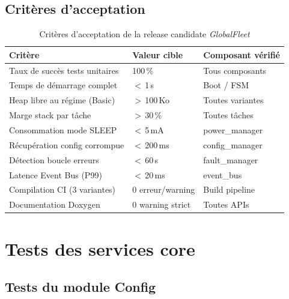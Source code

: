 \subsection{Critères d'acceptation}
\label{subsec:accept}

\begin{table}[H]
\centering
\renewcommand{\arraystretch}{1.6}
\caption{Critères d'acceptation de la release candidate \textit{GlobalFleet}}
\label{tab:acceptance}
\small
\begin{tabular}{|p{4.8cm}|p{3.0cm}|p{3.5cm}|}
\hline
\rowcolor{gray!20}
\textbf{Critère} & \textbf{Valeur cible} & \textbf{Composant vérifié} \\
\hline
Taux de succès tests unitaires   & 100\,\%         & Tous composants \\
\hline
Temps de démarrage complet       & $<$\,1\,s        & Boot / FSM \\
\hline
Heap libre au régime (Basic)     & $>$\,100\,Ko     & Toutes variantes \\
\hline
Marge stack par tâche            & $>$\,30\,\%      & Toutes tâches \\
\hline
Consommation mode SLEEP          & $<$\,5\,mA       & power\_manager \\
\hline
Récupération config corrompue    & $<$\,200\,ms     & config\_manager \\
\hline
Détection boucle erreurs         & $<$\,60\,s       & fault\_manager \\
\hline
Latence Event Bus (P99)          & $<$\,20\,ms      & event\_bus \\
\hline
Compilation CI (3 variantes)     & 0 erreur/warning & Build pipeline \\
\hline
Documentation Doxygen            & 0 warning strict & Toutes APIs \\
\hline
\end{tabular}
\end{table}

\section{Tests des services core}
\label{sec:core_tests}

\subsection{Tests du module Config}
\label{subsec:t_config}

